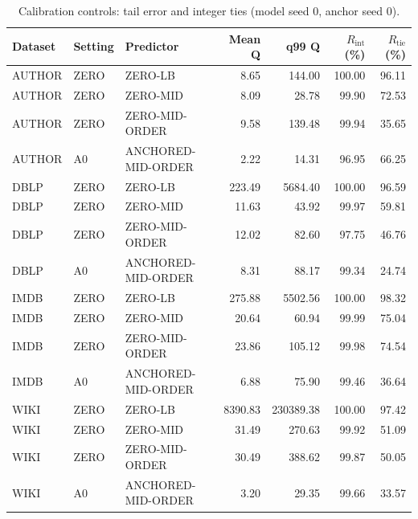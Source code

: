 \begin{table}[H]
\centering
\small
\setlength{\tabcolsep}{5pt}
\caption{Calibration controls: tail error and integer ties (model seed 0, anchor seed 0).}
\label{tab:C_zero}
\begin{tabular}{@{}lllrrrr@{}}
\toprule
Dataset & Setting & Predictor & Mean Q & q99 Q & $R_{\mathrm{int}}$ (\%) & $R_{\mathrm{tie}}$ (\%) \\
\midrule
AUTHOR & ZERO & ZERO-LB & 8.65 & 144.00 & 100.00 & 96.11 \\
AUTHOR & ZERO & ZERO-MID & 8.09 & 28.78 & 99.90 & 72.53 \\
AUTHOR & ZERO & ZERO-MID-ORDER & 9.58 & 139.48 & 99.94 & 35.65 \\
AUTHOR & A0 & ANCHORED-MID-ORDER & 2.22 & 14.31 & 96.95 & 66.25 \\
\midrule
DBLP & ZERO & ZERO-LB & 223.49 & 5684.40 & 100.00 & 96.59 \\
DBLP & ZERO & ZERO-MID & 11.63 & 43.92 & 99.97 & 59.81 \\
DBLP & ZERO & ZERO-MID-ORDER & 12.02 & 82.60 & 97.75 & 46.76 \\
DBLP & A0 & ANCHORED-MID-ORDER & 8.31 & 88.17 & 99.34 & 24.74 \\
\midrule
IMDB & ZERO & ZERO-LB & 275.88 & 5502.56 & 100.00 & 98.32 \\
IMDB & ZERO & ZERO-MID & 20.64 & 60.94 & 99.99 & 75.04 \\
IMDB & ZERO & ZERO-MID-ORDER & 23.86 & 105.12 & 99.98 & 74.54 \\
IMDB & A0 & ANCHORED-MID-ORDER & 6.88 & 75.90 & 99.46 & 36.64 \\
\midrule
WIKI & ZERO & ZERO-LB & 8390.83 & 230389.38 & 100.00 & 97.42 \\
WIKI & ZERO & ZERO-MID & 31.49 & 270.63 & 99.92 & 51.09 \\
WIKI & ZERO & ZERO-MID-ORDER & 30.49 & 388.62 & 99.87 & 50.05 \\
WIKI & A0 & ANCHORED-MID-ORDER & 3.20 & 29.35 & 99.66 & 33.57 \\
\bottomrule
\end{tabular}
\end{table}
